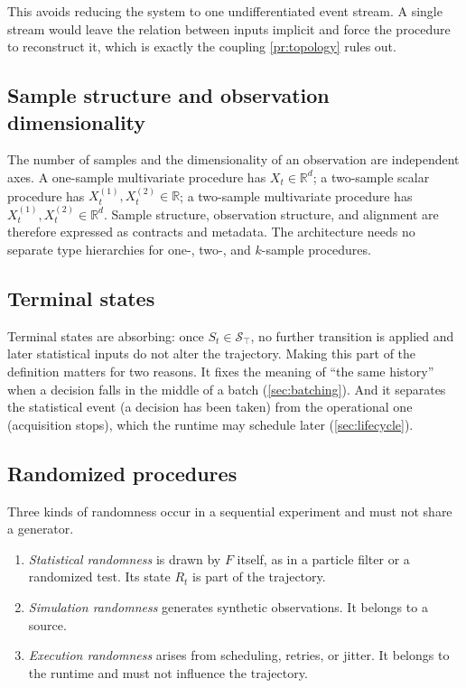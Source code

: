\documentclass[11pt,a4paper]{article}
\theoremstyle{definition}
\theoremstyle{remark}
\newcommand{\State}{\mathcal{S}}
\newcommand{\Term}{\State_{\top}}
\begin{document}
This avoids reducing the system to one undifferentiated event stream.
A single stream would leave the relation between inputs implicit and
force the procedure to reconstruct it, which is exactly the coupling
\cref{pr:topology} rules out.

\subsection{Sample structure and observation dimensionality}

The number of samples and the dimensionality of an observation are
independent axes. A one-sample multivariate procedure has
$X_t\in\mathbb{R}^d$; a two-sample scalar procedure has
$X_t^{(1)},X_t^{(2)}\in\mathbb{R}$; a two-sample multivariate procedure
has $X_t^{(1)},X_t^{(2)}\in\mathbb{R}^d$. Sample structure, observation
structure, and alignment are therefore expressed as contracts and
metadata. The architecture needs no separate type hierarchies for one-,
two-, and $k$-sample procedures.

\subsection{Terminal states}
\label{sec:terminal}

Terminal states are absorbing: once $S_t\in\Term$, no further transition
is applied and later statistical inputs do not alter the trajectory.
Making this part of the definition matters for two reasons. It fixes the
meaning of ``the same history'' when a decision falls in the middle of a
batch (\cref{sec:batching}). And it separates the statistical event
(a decision has been taken) from the operational one (acquisition
stops), which the runtime may schedule later (\cref{sec:lifecycle}).

\subsection{Randomized procedures}
\label{sec:random}

Three kinds of randomness occur in a sequential experiment and must not
share a generator.

\begin{enumerate}[nosep]
    \item \emph{Statistical randomness} is drawn by $F$ itself, as in a
    particle filter or a randomized test. Its state $R_t$ is part of the
    trajectory.
    \item \emph{Simulation randomness} generates synthetic observations.
    It belongs to a source.
    \item \emph{Execution randomness} arises from scheduling, retries,
    or jitter. It belongs to the runtime and must not influence the
    trajectory.
\end{enumerate}
\end{document}
